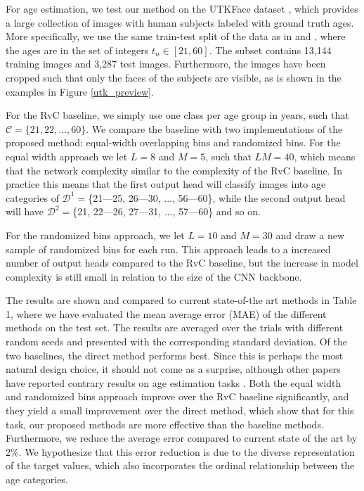 \documentclass[10pt, conference, a4paper]{IEEEtran}
\begin{document}
For age estimation, we test our method on the UTKFace dataset \cite{zhifei2017cvpr}, which provides a large collection of images with human subjects labeled with ground truth ages. More specifically, we use the same train-test split of the data as in \cite{cao2019rank} and \cite{gustafsson2019dctd}, where the ages are in the set of integers $t_n \in [21, 60]$. The subset contains 13,144 training images and 3,287 test images. Furthermore, the images have been cropped such that only the faces of the subjects are visible, as is shown in the examples in Figure \ref{utk_preview}. 

For the RvC baseline, we simply use one class per age group in years, such that $\mathcal{C} = \{21, 22, ..., 60\}$. We compare the baseline with two implementations of the proposed method: equal-width overlapping bins and randomized bins. For the equal width approach we let $L = 8$ and $M = 5$, such that $LM = 40$, which means that the network complexity similar to the complexity of the RvC baseline. In practice this means that the first output head will classify images into age categories of $\mathcal{D}^1 = $\{21---25, 26---30, ..., 56---60\}, while the second output head will have $\mathcal{D}^2 = $\{21, 22---26, 27---31, ..., 57---60\} and so on.

For the randomized bins approach, we let $L = 10$ and $M = 30$ and draw a new sample of randomized bins for each run. This approach leads to a increased number of output heads compared to the RvC baseline, but the increase in model complexity is still small in relation to the size of the CNN backbone.

The results are shown and compared to current state-of-the art methods in Table 1, where we have evaluated the mean average error (MAE) of the different methods on the test set. The results are averaged over the trials with different random seeds and presented with the corresponding standard deviation. Of the two baselines, the direct method performs best. Since this is perhaps the most natural design choice, it should not come as a surprise, although other papers have reported contrary results on age estimation tasks \cite{rothe2015dex}. Both the equal width and randomized bins approach improve over the RvC baseline significantly, and they yield a small improvement over the direct method, which show that for this task, our proposed methods are more effective than the baseline methods. Furthermore, we reduce the average error compared to current state of the art by 2\%. We hypothesize that this error reduction is due to the diverse representation of the target values, which also incorporates the ordinal relationship between the age categories.
\end{document}

